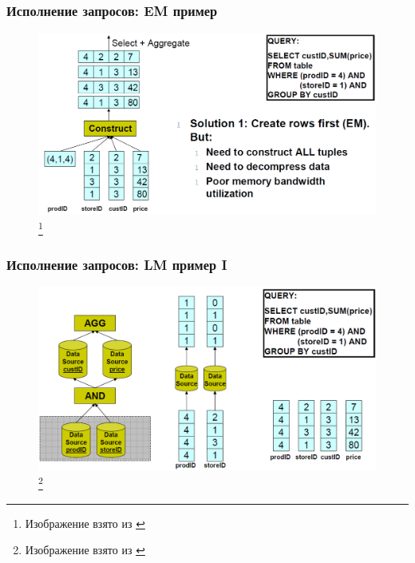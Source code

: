 \documentclass{beamer}
\begin{document}
\begin{frame}
\frametitle{Исполнение запросов: EM пример}

\begin{figure}[htb]
\includegraphics[width=\textwidth,height=0.75\textheight,keepaspectratio]{em.png} 
\footnote{\tiny{Изображение взято из \cite{Harizopoulos2009}}}
 \end{figure}    

\end{frame}

\begin{frame}
\frametitle{Исполнение запросов: LM пример I}

\begin{figure}[htb]
\includegraphics[width=\textwidth,height=0.75\textheight,keepaspectratio]{lm1.png} 
\footnote{\tiny{Изображение взято из \cite{Harizopoulos2009}}}
 \end{figure}    

\end{frame}
\end{document}
